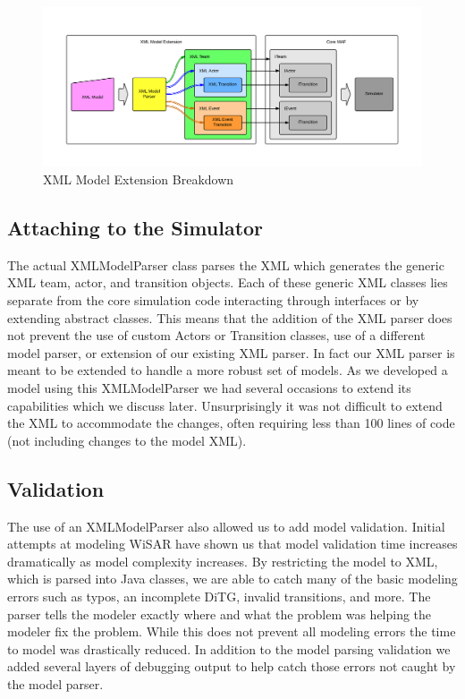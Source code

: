 \begin{figure}[h]
\begin{center}
\includegraphics[width=6in]{xml_model_extension.png}
\caption{XML Model Extension Breakdown}
\label{fig:xml_model_extension}
\end{center}
\end{figure}

\subsection{Attaching to the Simulator}

The actual XMLModelParser class parses the XML which generates the generic XML team, actor, and transition objects.  Each of these generic XML classes lies separate from the core simulation code interacting through interfaces or by extending abstract classes.  This means that the addition of the XML parser does not prevent the use of custom Actors or Transition classes, use of a different model parser, or extension of our existing XML parser.  In fact our XML parser is meant to be extended to handle a more robust set of models.   As we developed a model using this XMLModelParser we had several occasions to extend its capabilities which we discuss later.  Unsurprisingly it was not difficult to extend the XML to accommodate the changes, often requiring less than 100 lines of code (not including changes to the model XML).

\subsection{Validation}

The use of an XMLModelParser also allowed us to add model validation.  Initial attempts at modeling WiSAR have shown us that model validation time increases dramatically as model complexity increases.  By restricting the model to XML, which is parsed into Java classes, we are able to catch many of the basic modeling errors such as typos, an incomplete DiTG, invalid transitions, and more.  The parser tells the modeler exactly where and what the problem was helping the modeler fix the problem.  While this does not prevent all modeling errors the time to model was drastically reduced.  In addition to the model parsing validation we added several layers of debugging output to help catch those errors not caught by the model parser.


